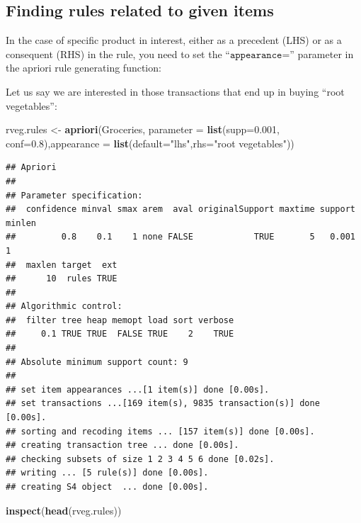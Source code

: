 \documentclass[
]{book}
\newenvironment{Shaded}{\begin{snugshade}}{\end{snugshade}}
\newcommand{\DataTypeTok}[1]{\textcolor[rgb]{0.13,0.29,0.53}{#1}}
\newcommand{\FloatTok}[1]{\textcolor[rgb]{0.00,0.00,0.81}{#1}}
\newcommand{\KeywordTok}[1]{\textcolor[rgb]{0.13,0.29,0.53}{\textbf{#1}}}
\newcommand{\NormalTok}[1]{#1}
\newcommand{\StringTok}[1]{\textcolor[rgb]{0.31,0.60,0.02}{#1}}
\begin{document}
\hypertarget{finding-rules-related-to-given-items}{%
\subsection{Finding rules related to given items}\label{finding-rules-related-to-given-items}}

In the case of specific product in interest, either as a precedent (LHS) or as a consequent (RHS) in the rule, you need to set the ``\(\texttt{appearance=}\)'' parameter in the apriori rule generating function:

Let us say we are interested in those transactions that end up in buying ``root vegetables'':

\begin{Shaded}
\begin{Highlighting}[]
\NormalTok{rveg.rules <-}\StringTok{ }\KeywordTok{apriori}\NormalTok{(Groceries, }\DataTypeTok{parameter =} \KeywordTok{list}\NormalTok{(}\DataTypeTok{supp=}\FloatTok{0.001}\NormalTok{, }\DataTypeTok{conf=}\FloatTok{0.8}\NormalTok{),}\DataTypeTok{appearance =} \KeywordTok{list}\NormalTok{(}\DataTypeTok{default=}\StringTok{"lhs"}\NormalTok{,}\DataTypeTok{rhs=}\StringTok{"root vegetables"}\NormalTok{))}
\end{Highlighting}
\end{Shaded}

\begin{verbatim}
## Apriori
## 
## Parameter specification:
##  confidence minval smax arem  aval originalSupport maxtime support minlen
##         0.8    0.1    1 none FALSE            TRUE       5   0.001      1
##  maxlen target  ext
##      10  rules TRUE
## 
## Algorithmic control:
##  filter tree heap memopt load sort verbose
##     0.1 TRUE TRUE  FALSE TRUE    2    TRUE
## 
## Absolute minimum support count: 9 
## 
## set item appearances ...[1 item(s)] done [0.00s].
## set transactions ...[169 item(s), 9835 transaction(s)] done [0.00s].
## sorting and recoding items ... [157 item(s)] done [0.00s].
## creating transaction tree ... done [0.00s].
## checking subsets of size 1 2 3 4 5 6 done [0.02s].
## writing ... [5 rule(s)] done [0.00s].
## creating S4 object  ... done [0.00s].
\end{verbatim}

\begin{Shaded}
\begin{Highlighting}[]
\KeywordTok{inspect}\NormalTok{(}\KeywordTok{head}\NormalTok{(rveg.rules))}
\end{Highlighting}
\end{Shaded}
\end{document}
